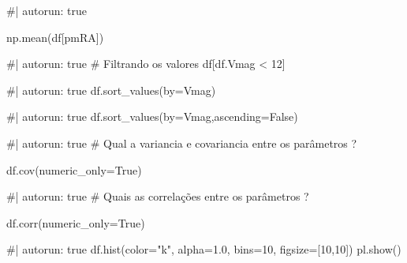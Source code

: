\documentclass[
  letterpaper,
  DIV=11,
  numbers=noendperiod]{scrreprt}
\newenvironment{Shaded}{\begin{snugshade}}{\end{snugshade}}
\newcommand{\NormalTok}[1]{\textcolor[rgb]{0.00,0.23,0.31}{#1}}
\begin{document}
\begin{Shaded}
\begin{Highlighting}[]
\NormalTok{\#| autorun: true}

\NormalTok{np.mean(df[\textquotesingle{}pmRA\textquotesingle{}])}
\end{Highlighting}
\end{Shaded}

\begin{Shaded}
\begin{Highlighting}[]
\NormalTok{\#| autorun: true}
\NormalTok{\# Filtrando os valores}
\NormalTok{df[df.Vmag \textless{} 12]}
\end{Highlighting}
\end{Shaded}

\begin{Shaded}
\begin{Highlighting}[]
\NormalTok{\#| autorun: true}
\NormalTok{df.sort\_values(by=\textquotesingle{}Vmag\textquotesingle{})}
\end{Highlighting}
\end{Shaded}

\begin{Shaded}
\begin{Highlighting}[]
\NormalTok{\#| autorun: true}
\NormalTok{df.sort\_values(by=\textquotesingle{}Vmag\textquotesingle{},ascending=False)}
\end{Highlighting}
\end{Shaded}

\begin{Shaded}
\begin{Highlighting}[]
\NormalTok{\#| autorun: true}
\NormalTok{\# Qual a variancia e covariancia entre os parâmetros ?}

\NormalTok{df.cov(numeric\_only=True)}
\end{Highlighting}
\end{Shaded}

\begin{Shaded}
\begin{Highlighting}[]
\NormalTok{\#| autorun: true}
\NormalTok{\# Quais as correlações entre os parâmetros ?}

\NormalTok{df.corr(numeric\_only=True)}
\end{Highlighting}
\end{Shaded}

\begin{Shaded}
\begin{Highlighting}[]
\NormalTok{\#| autorun: true}
\NormalTok{df.hist(color="k", alpha=1.0, bins=10, figsize=[10,10])}
\NormalTok{pl.show()}
\end{Highlighting}
\end{Shaded}
\end{document}
